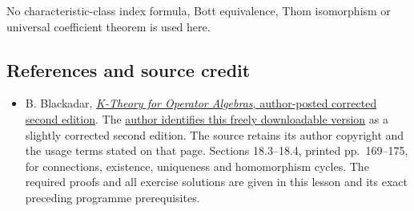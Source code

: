 \documentclass[
  11pt,
]{article}
\providecommand{\tightlist}{%
  \setlength{\itemsep}{0pt}\setlength{\parskip}{0pt}}
\begin{document}
No characteristic-class index formula, Bott equivalence, Thom
isomorphism or universal coefficient theorem is used here.

\subsection{References and source
credit}\label{references-and-source-credit}

\begin{itemize}
\tightlist
\item
  B. Blackadar,
  \href{https://www.bruceblackadar.com/Mathematics/book6.pdf}{\emph{K-Theory
  for Operator Algebras}, author-posted corrected second edition}. The
  \href{https://www.bruceblackadar.com/mathpubs.html}{author identifies
  this freely downloadable version} as a slightly corrected second
  edition. The source retains its author copyright and the usage terms
  stated on that page. Sections 18.3--18.4, printed pp.~169--175, for
  connections, existence, uniqueness and homomorphism cycles. The
  required proofs and all exercise solutions are given in this lesson
  and its exact preceding programme prerequisites.
\end{itemize}
\end{document}
